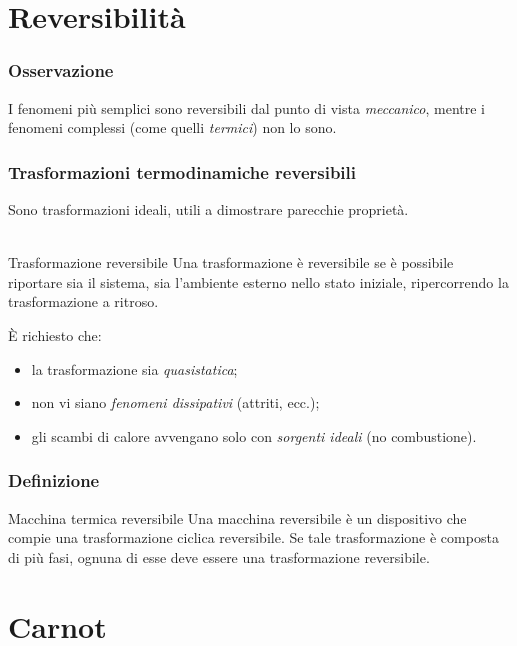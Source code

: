 \documentclass[]{beamer}
\theoremstyle{plain}
\begin{document}
\section{Reversibilità}

\begin{frame}
  \frametitle{Osservazione}
  I fenomeni più semplici sono reversibili dal punto di vista \emph{meccanico}, mentre i fenomeni complessi (come quelli \emph{termici}) non lo sono.
\end{frame}

\begin{frame}
  \frametitle{Trasformazioni termodinamiche reversibili}
  Sono trasformazioni ideali, utili a dimostrare parecchie proprietà.\\~\\\pause
    \begin{block}{Trasformazione reversibile}
    Una trasformazione è reversibile se è possibile riportare sia il sistema, sia l'ambiente esterno nello stato iniziale, ripercorrendo la trasformazione a ritroso.
    \end{block}\pause
    È richiesto che:
    \begin{itemize}
      \item la trasformazione sia \emph{quasistatica};\pause
      \item non vi siano \emph{fenomeni dissipativi} (attriti, ecc.);\pause
      \item gli scambi di calore avvengano solo con \emph{sorgenti ideali} (no combustione).
    \end{itemize}
\end{frame}



\begin{frame}
  \frametitle{Definizione}
  \begin{block}{Macchina termica reversibile}
    Una macchina reversibile è un dispositivo che compie una trasformazione ciclica reversibile. Se tale trasformazione è composta di più fasi, ognuna di esse deve essere una trasformazione reversibile.
  \end{block}
\end{frame}


\section{Carnot}
\end{document}
